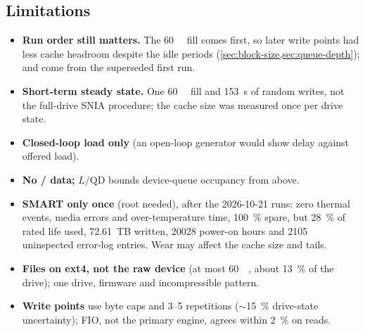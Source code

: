 \subsection{Limitations}
\begin{itemize}
  \item \textbf{Run order still matters.} The \qty{60}{\gibi\byte} fill comes first, so later write points
        had less cache headroom despite the idle periods (\cref{sec:block-size,sec:queue-depth});
         and  come from the superseded first run.
  \item \textbf{Short-term steady state.} One \qty{60}{\gibi\byte} fill and \qty{153}{\second} of random
        writes, not the full-drive SNIA procedure; the cache size was measured once per drive state.
  \item \textbf{Closed-loop load only} (an open-loop generator would show delay against offered load).
  \item \textbf{No / data;} $L/\text{QD}$ bounds device-queue occupancy from above.
  \item \textbf{SMART only once} (root needed), after the 2026-10-21 runs: zero thermal events, media
        errors and over-temperature time, \qty{100}{\percent} spare, but \qty{28}{\percent} of rated life
        used, \qty{72.61}{TB} written, \num{20028} power-on hours and \num{2105} uninspected error-log
        entries. Wear may affect the cache size and tails.
  \item \textbf{Files on ext4, not the raw device} (at most \qty{60}{\gibi\byte}, about
        \qty{13}{\percent} of the drive); one drive, firmware and incompressible pattern.
  \item \textbf{Write points} use byte caps and 3--5 repetitions (\ensuremath{\sim}\qty{15}{\percent}
        drive-state uncertainty); FIO, not the primary engine, agrees within \qty{2}{\percent} on reads.
\end{itemize}
